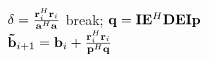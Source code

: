 \documentclass[10pt]{article}
\begin{document}
\begin{algorithmic}
  
  \STATE
  $\delta = \frac{{\bf r}^H_i{\bf r}_i}{{\bf a}^H{\bf a}}$
  \IF {$\delta < \epsilon$}
  \STATE 
  break;
  \ELSE
  \STATE 
  ${\bf q} = {\bf I}{\bf E}^H{\bf DEIp}$\\
  ${\bf \tilde b}_{i+1} = {\bf b}_i + \frac{{\bf r}^H_i{\bf r}_i}{{\bf p}^H{\bf q}}$
  \ENDIF
  
  \ENDFOR

\end{algorithmic}
\end{document}
